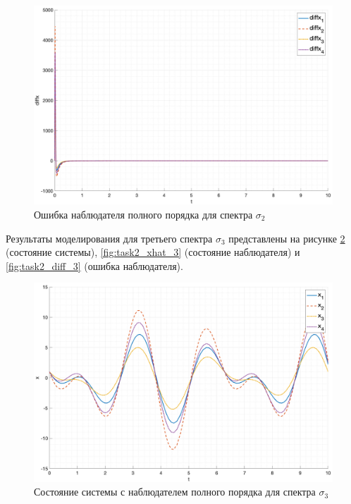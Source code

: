 \begin{figure}[ht!]
    \centering
    \includegraphics[width=\textwidth]{media/plots/task2_diffx_2.png}
    \caption{Ошибка наблюдателя полного порядка для спектра $\sigma_2$}
    \label{fig:task2_diff_2}
\end{figure}

Результаты моделирования для третьего спектра $\sigma_3$ представлены на рисунке \ref{fig:task2_x_3} (состояние системы), \ref{fig:task2_xhat_3} (состояние наблюдателя) и \ref{fig:task2_diff_3} (ошибка наблюдателя).
\begin{figure}[ht!]
    \centering
    \includegraphics[width=\textwidth]{media/plots/task2_x_3.png}
    \caption{Состояние системы с наблюдателем полного порядка для спектра $\sigma_3$}
    \label{fig:task2_x_3}
\end{figure}

